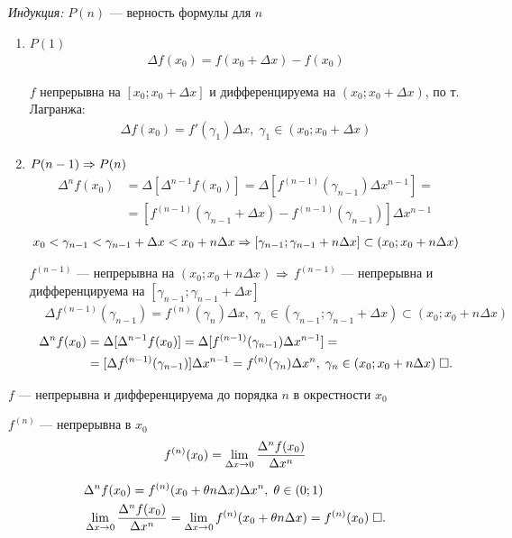 \documentclass{article}
\begin{document}
\proof

{\it Индукция:} $P(n)$ --- верность формулы для $n$
\begin{enumerate}
	\item{}$P(1)$
	\begin{align*}
		\Delta f(x_0)=f(x_0+\Delta x)-f(x_0)
	\end{align*}

	$f$ непрерывна на $[x_0;x_0+\Delta x]$ и дифференцируема на $(x_0;x_0+\Delta x)$, по т. Лагранжа:
	\begin{align*}
		\Delta f(x_0)=f'(\gamma_{1})\Delta x,\;\gamma_1\in (x_0;x_0+\Delta x)
	\end{align*}

	\item{}$P(n-1)\Rarr P(n)$
	\begin{align*}
		\Delta^{n} f(x_0)
		 & =\Delta[\Delta^{n-1}f(x_0)]=\Delta[f^{(n-1)}(\gamma_{n-1})\Delta x^{n-1}]= \\
		 & =[f^{(n-1)}(\gamma_{n-1}+\Delta x)-f^{(n-1)}(\gamma_{n-1})]\Delta x^{n-1}
	\end{align*}
	\begin{align*}
		x_0<\gamma_{n-1}<\gamma_{n-1}+\Delta x<x_0+n\Delta x\Rarr [\gamma_{n-1};\gamma_{n-1}+n\Delta x]\subset (x_0;x_0+n\Delta x)
	\end{align*}

	$f^{(n-1)}$ --- непрерывна на $(x_0;x_0+n\Delta x)$ $\Rarr$ $f^{(n-1)}$ --- непрерывна и\\
	дифференцируема на $[\gamma_{n-1};\gamma_{n-1}+\Delta x]$
	\begin{align*}
		 & \Delta f^{(n-1)}(\gamma_{n-1})=f^{(n)}(\gamma_{n})\Delta x,\;\gamma_{n}\in(\gamma_{n-1};\gamma_{n-1}+\Delta x)\subset (x_0;x_0+n\Delta x)
	\end{align*}
	\begin{align*}
		\Delta^{n}f(x_0)
		 & =\Delta[\Delta^{n-1}f(x_0)]=\Delta[f^{(n-1)}(\gamma_{n-1})\Delta x^{n-1}]=                                              \\
		 & =[\Delta f^{(n-1)}(\gamma_{n-1})]\Delta x^{n-1}=f^{(n)}(\gamma_{n})\Delta x^{n},\;\gamma_{n}\in (x_0;x_0+n\Delta x)\qed
	\end{align*}
\end{enumerate}

\pagebreak

\theorem

$f$ --- непрерывна и дифференцируема до порядка $n$ в окрестности $x_0$

$f^{(n)}$ --- непрерывна в $x_0$
\begin{align*}
	f^{(n)}(x_0)=\slim{\Delta x\to 0}\frac{\Delta^{n}f(x_0)}{\Delta x^{n}}
\end{align*}

\proof
\begin{align*}
	 & \Delta^{n}f(x_0)=f^{(n)}(x_0+\theta n\Delta x)\Delta x^{n},\;\theta\in(0;1)                                                  \\
	 & \slim{\Delta x\to 0}\frac{\Delta^{n}f(x_0)}{\Delta x^{n}}=\slim{\Delta x\to 0}f^{(n)}(x_0+\theta n\Delta x)=f^{(n)}(x_0)\qed
\end{align*}
\end{document}
